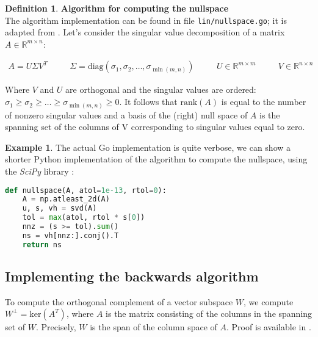 \documentclass{article}
\theoremstyle{plain}%
\theoremstyle{definition}
\newtheorem{defn}{Definition}[section]
\newtheorem{exmp}{Example}[section]
\theoremstyle{remark}
\def\R{\mathbb{R}}
\newcommand{\diag}[1]{\text{diag}\left(#1\right)}
\newcommand{\mker}[1]{\text{ker}\left(#1\right)}
\newcommand{\mrank}[1]{\text{rank}\left(#1\right)}
\begin{document}
\begin{defn}
  \textbf{Algorithm for computing the nullspace} \\
  The algorithm implementation can be found in file \texttt{lin/nullspace.go}; it is
  adapted from \cite{scipy/ranknullspace}. 
  Let's consider the singular value decomposition of a matrix $A \in \R^{m \times n}$:

  \begin{equation*}
    \begin{aligned}
      A = U \Sigma V^T & \quad & \Sigma = \diag{\sigma_1, \sigma_2, \hdots, \sigma_{\min(m, n)}  } 
       & \quad &  U \in \R^{m \times m} & \quad & V \in \R^{n \times n}
    \end{aligned}
  \end{equation*}

  Where $V$ and $U$ are orthogonal and the singular values are ordered: $\sigma_1 \geq \sigma_2 \geq \hdots \geq \sigma_{\min(m,n)} \geq 0$.
  It follows that $\mrank{A}$ is equal to the number of nonzero singular values and
  a basis of the (right) null space of $A$ is the spanning set of the columns of V
  corresponding to singular values equal to zero. 
\end{defn}

\begin{exmp}
  The actual Go implementation is quite verbose, we can show a shorter Python 
  implementation of the algorithm to compute the nullspace, using the 
  \textit{SciPy} library \cite{scipy/ranknullspace}:

  \begin{lstlisting}[language=python]
def nullspace(A, atol=1e-13, rtol=0):
    A = np.atleast_2d(A)
    u, s, vh = svd(A)
    tol = max(atol, rtol * s[0])
    nnz = (s >= tol).sum()
    ns = vh[nnz:].conj().T
    return ns
    \end{lstlisting}
\end{exmp}



\subsection{Implementing the backwards algorithm}

To compute the orthogonal complement of a vector subspace $W$, we
compute $W^\perp = \mker{A^T}$, where $A$ is the matrix consisting 
of the columns in the spanning set of $W$. Precisely, $W$ is the span 
of the column space of $A$. Proof is available in \cite{ila}.
\end{document}
